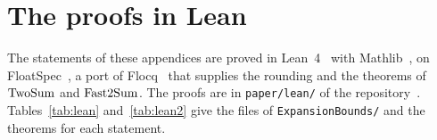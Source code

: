 
\section{The proofs in Lean}\label{sec:lean}

The statements of these appendices are proved in Lean~4~\cite{Lean4} with Mathlib~\cite{Mathlib}, on
FloatSpec~\cite{FloatSpec}, a port of Flocq~\cite{BM11} that supplies the rounding and the theorems of $\mathrm{TwoSum}$ and
$\mathrm{Fast2Sum}$. The proofs are in \texttt{paper/lean/} of the repository~\cite{md}. Tables~\ref{tab:lean}
and~\ref{tab:lean2} give the files of \texttt{ExpansionBounds/} and the theorems for each statement.
